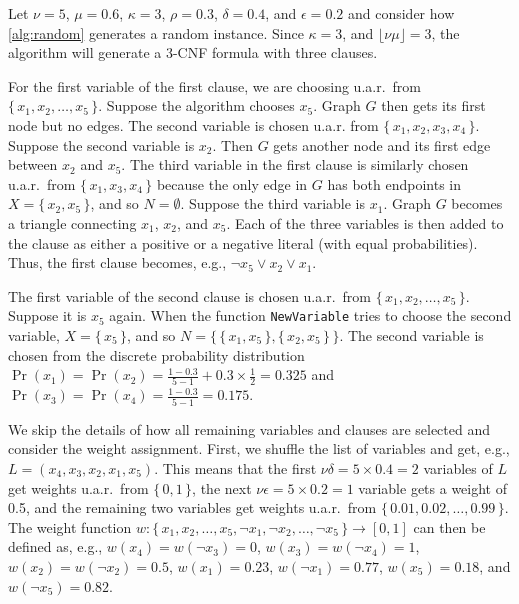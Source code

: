 \documentclass[runningheads]{llncs}
\begin{document}
\begin{example}\label{example:algorithm}
  Let $\nu = 5$, $\mu = 0.6$, $\kappa = 3$, $\rho = 0.3$, $\delta = 0.4$,
  and $\epsilon = 0.2$ and consider how \cref{alg:random} generates a random
  instance. Since $\kappa = 3$, and $\lfloor\nu\mu\rfloor = 3$,
  the algorithm will generate a 3-CNF formula with three clauses.

  For the first variable of the first clause, we are choosing u.a.r.\ from $\{\,
  x_1, x_2, \dots, x_5 \,\}$. Suppose the algorithm chooses $x_5$. Graph $G$
  then gets its first node but no edges. The second variable is chosen u.a.r.
  from $\{\, x_1, x_2, x_3, x_4 \,\}$. Suppose the second variable is $x_2$.
  Then $G$ gets another node and its first edge between $x_2$ and $x_5$. The
  third variable in the first clause is similarly chosen u.a.r.\ from $\{\, x_1,
  x_3, x_4 \,\}$ because the only edge in $G$ has both endpoints in $X = \{\,
  x_2, x_5 \,\}$, and so $N = \emptyset$. Suppose the third variable is $x_1$.
  Graph $G$ becomes a triangle connecting $x_1$, $x_2$, and $x_5$. Each of
  the three variables is then added to the clause as either a positive or a
  negative literal (with equal probabilities). Thus, the first clause becomes,
  e.g., $\neg x_5 \lor x_2 \lor x_1$.

  The first variable of the second clause is chosen u.a.r.\ from
  $\{\, x_1, x_2, \dots, x_5\,\}$. Suppose it is $x_5$ again. When the function
  \texttt{NewVariable} tries to choose the second variable, $X = \{\, x_5 \,\}$,
  and so $N = \{\, \{\, x_1, x_5 \,\}, \{\, x_2, x_5 \,\}\,\}$. The second
  variable is chosen from the discrete probability distribution
  $\Pr(x_1) = \Pr(x_2) = \frac{1 - 0.3}{5 - 1} + 0.3 \times \frac{1}{2} = 0.325$
  and $\Pr(x_3) = \Pr(x_4) = \frac{1 - 0.3}{5 - 1} = 0.175$.

  We skip the details of how all remaining variables and clauses are selected
  and consider the weight assignment. First, we shuffle the list of variables
  and get, e.g., $L = (x_4, x_3, x_2, x_1, x_5)$. This means that the first
  $\nu\delta = 5 \times 0.4 = 2$ variables of $L$ get weights u.a.r.\ from $\{\,
  0, 1 \,\}$, the next $\nu\epsilon = 5 \times 0.2 = 1$ variable gets a weight
  of 0.5, and the remaining two variables get weights u.a.r.\ from $\{\,0.01,
  0.02, \dots, 0.99 \,\}$. The weight function $w\colon \{\, x_1, x_2, \dots,
  x_5, \neg x_1, \neg x_2, \dots, \neg x_5\,\} \to [0, 1]$ can then be defined
  as, e.g., $w(x_4) = w(\neg x_3) = 0$, $w(x_3) = w(\neg x_4) = 1$, $w(x_2) =
  w(\neg x_2) = 0.5$, $w(x_1) = 0.23$, $w(\neg x_1) = 0.77$, $w(x_5) = 0.18$,
  and $w(\neg x_5) = 0.82$.
\end{example}
\end{document}
